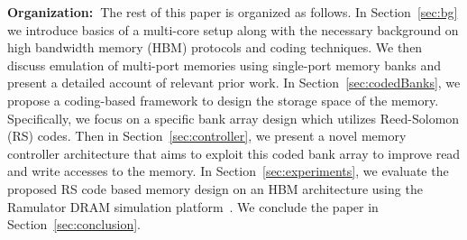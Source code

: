 \noindent \textbf{Organization:~}The rest of this paper is organized as follows. In Section~\ref{sec:bg} we introduce basics of a multi-core setup along with the necessary background on high bandwidth memory (HBM) protocols and coding techniques. We then discuss emulation of multi-port memories using single-port memory banks and present a detailed account of relevant prior work. In Section~\ref{sec:codedBanks}, we propose a coding-based framework to design the storage space of the memory. Specifically, we focus on a specific bank array design which utilizes Reed-Solomon (RS) codes. Then in Section~\ref{sec:controller}, we present a novel memory controller architecture that aims to exploit this coded bank array to improve read and write accesses to the memory. In Section~\ref{sec:experiments}, we evaluate the proposed RS code based memory design on an HBM architecture using the Ramulator DRAM simulation platform~\cite{Ramulator}. We conclude the paper in Section~\ref{sec:conclusion}. %



